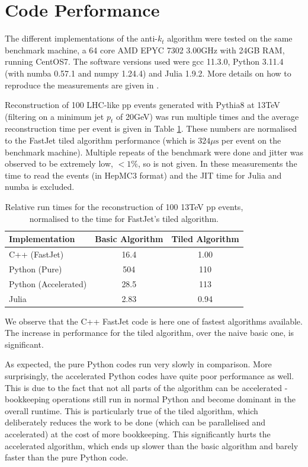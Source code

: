 \documentclass{webofc}
\begin{document}
\section{Code Performance}
\label{sec:performance}

The different implementations of the anti-$k_t$ algorithm were tested on the
same benchmark machine, a 64 core AMD EPYC 7302 \@ 3.00GHz with 24GB RAM,
running CentOS7. The software versions used were gcc 11.3.0, Python 3.11.4 (with
numba 0.57.1 and numpy 1.24.4) and Julia 1.9.2. More details on how to reproduce
the measurements are given in \cite{polyglot-jets-zenodo}.

Reconstruction of 100 LHC-like pp events generated with Pythia8 at 13TeV
(filtering on a minimum jet $p_t$ of 20GeV) was run multiple times and the
average reconstruction time per event is given in Table \ref{tab:results}. These
numbers are normalised to the FastJet tiled algorithm performance (which is
$324\mu \mathrm{s}$ per event on the benchmark machine). Multiple repeats of the
benchmark were done and jitter was observed to be extremely low, $<1\%$, so is
not given. In these measurements the time to read the events (in HepMC3 format)
and the JIT time for Julia and numba is excluded.

\begin{table}[h]
  \begin{center}
    \begin{tabular}{l|cc}
      \textbf{Implementation} & \textbf{Basic Algorithm} & \textbf{Tiled Algorithm} \\
      \hline
      C++ (FastJet) & 16.4 & 1.00 \\
      Python (Pure) & 504 & 110 \\
      Python (Accelerated) & 28.5 & 113 \\
      Julia & 2.83 & 0.94 \\
    \end{tabular}
    \caption{Relative run times for the reconstruction of 100 13TeV pp events, normalised to the time for FastJet's tiled algorithm.}
    \label{tab:results}
  \end{center}
\end{table}

We observe that the C++ FastJet code is here one of fastest algorithms
available. The increase in performance for the tiled algorithm, over the naive
basic one, is significant. 

As expected, the pure Python codes run very slowly in comparison. More
surprisingly, the accelerated Python codes have quite poor performance as well.
This is due to the fact that not all parts of the algorithm can be accelerated -
bookkeeping operations still run in normal Python and become dominant in the
overall runtime. This is particularly true of the tiled algorithm, which
deliberately reduces the work to be done (which can be parallelised and
accelerated) at the cost of more bookkeeping. This significantly hurts the
accelerated algorithm, which ends up slower than the basic algorithm and barely
faster than the pure Python code.
\end{document}
